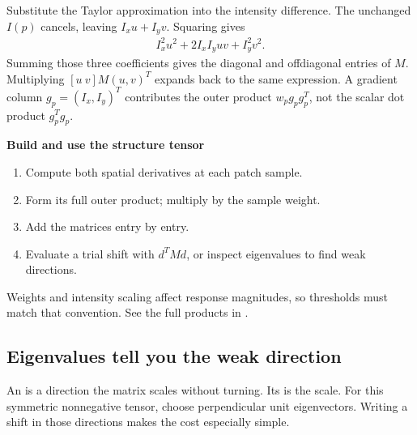 \documentclass[letterpaper,11pt,english,openany,oneside]{jupyterBook}
\begin{document}
\sphinxAtStartPar
{} Substitute the Taylor approximation into the intensity difference. The unchanged \(I(p)\) cancels, leaving \(I_xu+I_yv\). Squaring gives
\begin{equation*}
\begin{split}I_x^2u^2+2I_xI_yuv+I_y^2v^2.\end{split}
\end{equation*}
\sphinxAtStartPar
Summing those three coefficients gives the diagonal and off\sphinxhyphen{}diagonal entries of \(M\). Multiplying \([u\ v]M(u,v)^T\) expands back to the same expression. A gradient column \(g_p=(I_x,I_y)^T\) contributes the outer product \(w_pg_pg_p^T\), not the scalar dot product \(g_p^Tg_p\).

\begin{TextbookBox}
\textbf{Build and use the structure tensor}\par\smallskip
\begin{enumerate}
%
\item {}
\sphinxAtStartPar
Compute both spatial derivatives at each patch sample.

\item {}
\sphinxAtStartPar
Form its full outer product; multiply by the sample weight.

\item {}
\sphinxAtStartPar
Add the matrices entry by entry.

\item {}
\sphinxAtStartPar
Evaluate a trial shift with \(d^TMd\), or inspect eigenvalues to find weak directions.

\end{enumerate}

\sphinxAtStartPar
Weights and intensity scaling affect response magnitudes, so thresholds must match that convention. See the full products in {\hyperref[\detokenize{lectures/lecture05/quiz-workbook:quiz-a2-q1}]{}}.

\end{TextbookBox}


\subsection{Eigenvalues tell you the weak direction}
\label{\detokenize{lectures/lecture05/corners:eigenvalues-tell-you-the-weak-direction}}
\sphinxAtStartPar
An  is a direction the matrix scales without turning. Its  is the scale. For this symmetric nonnegative tensor, choose perpendicular unit eigenvectors. Writing a shift in those directions makes the cost especially simple.
\end{document}
